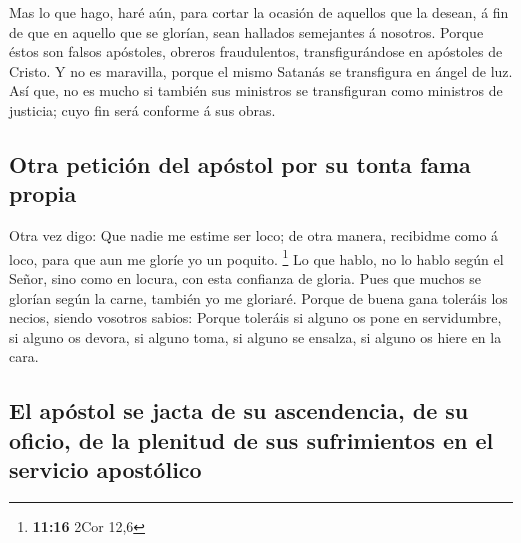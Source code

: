  Mas lo que hago, haré aún, para cortar la ocasión de
aquellos que la desean, á fin de que en aquello que se glorían, sean
hallados semejantes á nosotros.  Porque éstos son falsos
apóstoles, obreros fraudulentos, transfigurándose en apóstoles de
Cristo.  Y no es maravilla, porque el mismo Satanás se
transfigura en ángel de luz.  Así que, no es mucho si
también sus ministros se transfiguran como ministros de justicia; cuyo
fin será conforme á sus obras.

\hypertarget{otra-peticiuxf3n-del-apuxf3stol-por-su-tonta-fama-propia}{%
\subsection{Otra petición del apóstol por su tonta fama
propia}\label{otra-peticiuxf3n-del-apuxf3stol-por-su-tonta-fama-propia}}

 Otra vez digo: Que nadie me estime ser loco; de otra
manera, recibidme como á loco, para que aun me gloríe yo un poquito.
\footnote{\textbf{11:16} 2Cor 12,6}  Lo que hablo, no lo
hablo según el Señor, sino como en locura, con esta confianza de gloria.
 Pues que muchos se glorían según la carne, también yo me
gloriaré.  Porque de buena gana toleráis los necios,
siendo vosotros sabios:  Porque toleráis si alguno os
pone en servidumbre, si alguno os devora, si alguno toma, si alguno se
ensalza, si alguno os hiere en la cara.

\hypertarget{el-apuxf3stol-se-jacta-de-su-ascendencia-de-su-oficio-de-la-plenitud-de-sus-sufrimientos-en-el-servicio-apostuxf3lico}{%
\subsection{El apóstol se jacta de su ascendencia, de su oficio, de la
plenitud de sus sufrimientos en el servicio
apostólico}\label{el-apuxf3stol-se-jacta-de-su-ascendencia-de-su-oficio-de-la-plenitud-de-sus-sufrimientos-en-el-servicio-apostuxf3lico}}

